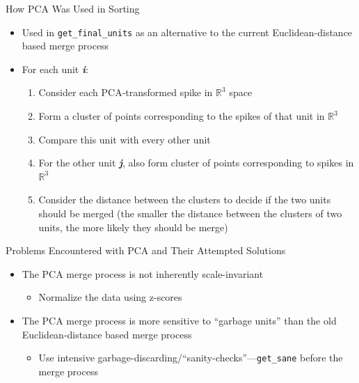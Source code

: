 \documentclass{beamer}
\begin{document}
    \begin{frame}{How PCA Was Used in Sorting}
        \begin{itemize}
            \pause
            \item Used in \texttt{get\_final\_units} as an alternative to the
current Euclidean-distance based merge process
            \pause
            \item For each unit \textbf{\emph{i}}:
            \begin{enumerate}
                \pause
                \item Consider each PCA-transformed spike in
\ensuremath{\mathbb{R}^3} space
                \item Form a cluster of points corresponding to the spikes of that unit in
\ensuremath{\mathbb{R}^3}
                \pause
                \item Compare this unit with every other unit
                \pause
                \item For the other unit \textbf{\emph{j}}, also form 
cluster of points corresponding to spikes in \ensuremath{\mathbb{R}^3}
                \pause
                \item Consider the distance between the clusters to decide if
the two units should be merged (the smaller the distance between the clusters of
two units, the more likely they should be merge)
            \end{enumerate}
         \end{itemize}
    \end{frame}

    \begin{frame}{Problems Encountered with PCA and Their Attempted Solutions}
        \begin{itemize}
            \pause
            \item The PCA merge process is not inherently scale-invariant
            \begin{itemize}
                \pause
                \item Normalize the data using z-scores
            \end{itemize}
                \pause
            \item The PCA merge process is more sensitive to ``garbage units''
than the old Euclidean-distance based merge process
            \begin{itemize}
                \pause
                \item Use intensive
garbage-discarding/``sanity-checks''---\texttt{get\_sane} before the merge
process
            \end{itemize}
        \end{itemize}
    \end{frame}
    
\end{document}
